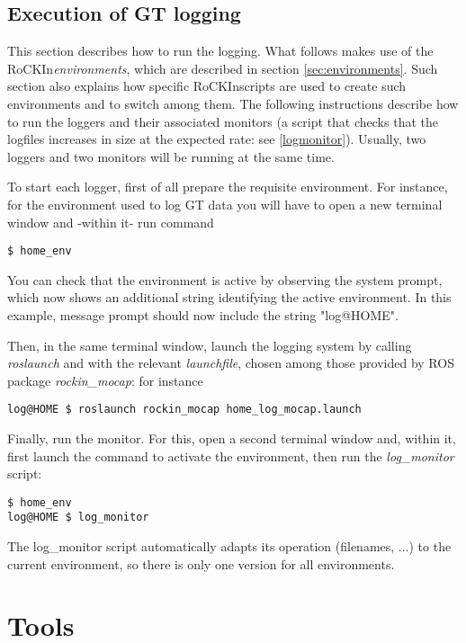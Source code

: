 \documentclass[a4paper]{article}
\newcommand{\ro}{RoCKIn}
\begin{document}
\subsection{Execution of GT logging}

This section describes how to run the logging. What follows makes use of the \ro \textit{environments}, which are described in section \ref{sec:environments}. Such section also explains how specific \ro scripts are used to create such environments and to switch among them.
The following instructions describe how to run the loggers and their associated monitors (a script that checks that the logfiles increases in size at the expected rate: see \ref{logmonitor}). Usually, two loggers and two monitors will be running at the same time.

To start each logger, first of all prepare the requisite environment. For instance, for the environment used to log \ro@Home GT data you will have to open a new terminal window and -within it- run command
\begin{verbatim}
$ home_env
\end{verbatim} 
You can check that the environment is active by observing the system prompt, which now shows an additional string identifying the active environment. In this example, message prompt should now include the string "log@HOME".

Then, in the same terminal window, launch the logging system by calling \emph{roslaunch} and with the relevant \textit{launchfile}, chosen among those provided by ROS package \textit{rockin\_mocap}: for instance
\begin{verbatim}
log@HOME $ roslaunch rockin_mocap home_log_mocap.launch
\end{verbatim} 

Finally, run the monitor. For this, open a second terminal window and, within it, first launch the command to activate the environment, then run the \emph{log\_monitor} script:
\begin{verbatim}
$ home_env
log@HOME $ log_monitor
\end{verbatim} 
The log\_monitor script automatically adapts its operation (filenames, ...) to the current environment, so there is only one version for all environments.

\clearpage

\section{Tools}
\label{sec:tools}
\end{document}
